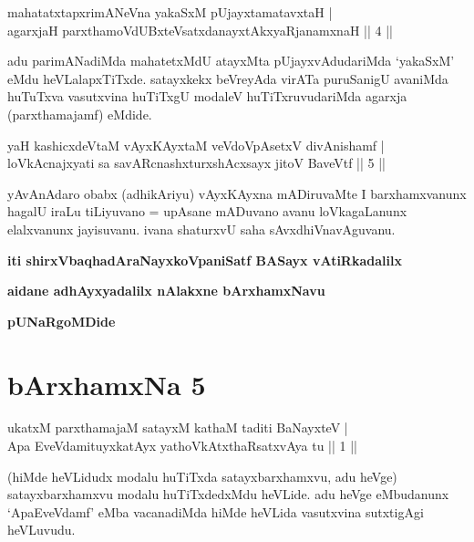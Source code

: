 \begin{shl}
mahatatxtapxrimANeVna yakaSxM pUjayxtamatavxtaH | \\
agarxjaH parxthamoVdUBxteVsatxdanayxtAkxyaRjanamxnaH \hfill ||  4 || 
\end{shl}

\begin{artha}
adu parimANadiMda mahatetxMdU atayxMta pUjayxvAdudariMda `yakaSxM' eMdu heVLalapxTiTxde. satayxkekx beVreyAda virATa puruSanigU avaniMda huTuTxva vasutxvina huTiTxgU modaleV huTiTxruvudariMda agarxja (parxthamajamf) eMdide.
\end{artha}


\begin{shl}
yaH kashicxdeVtaM vAyxKAyxtaM veVdoVpAsetxV divAnishamf | \\
loVkAcnajxyati sa savARcnashxturxshAcxsayx jitoV BaveVtf \hfill ||  5 ||
\end{shl}

\begin{artha}
yAvAnAdaro obabx (adhikAriyu) vAyxKAyxna mADiruvaMte I barxhamxvanunx hagalU iraLu tiLiyuvano = upAsane mADuvano avanu loVkagaLanunx elalxvanunx jayisuvanu. ivana shaturxvU saha sAvxdhiVnavAguvanu.
\end{artha}

\begin{center}
{\bf iti shirxVbaqhadAraNayxkoVpaniSatf BASayx vAtiRkadalilx}
\smallskip

{\bf aidane adhAyxyadalilx nAlakxne bArxhamxNavu}

\smallskip
{\bf pUNaRgoMDide}
\end{center}

\section*{bArxhamxNa 5}


\begin{shl}
ukatxM parxthamajaM satayxM kathaM taditi BaNayxteV | \\
Apa EveVdamituyxkatAyx yathoVkAtxthaRsatxvAya tu \hfill ||  1 || 
\end{shl}

\begin{artha}
(hiMde heVLidudx modalu huTiTxda satayxbarxhamxvu, adu heVge) satayxbarxhamxvu modalu huTiTxdedxMdu heVLide. adu heVge eMbudanunx `ApaEveVdamf' eMba vacanadiMda hiMde heVLida vasutxvina sutxtigAgi heVLuvudu.
\end{artha}

